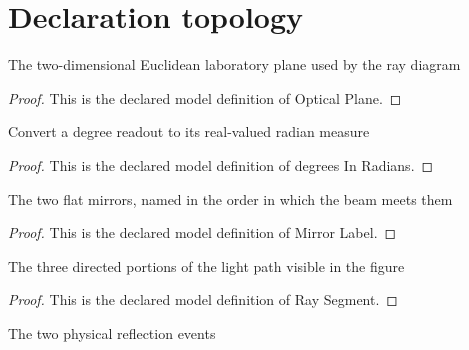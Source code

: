 \section{Declaration topology}
\begin{definition}
  \label{def:physics:phyx-mini-0142:phyxminiproblems-problemphyxmini0142-opticalplane}
  The two-dimensional Euclidean laboratory plane used by the ray diagram
\end{definition}
\begin{proof}
  This is the declared model definition of Optical Plane.
\end{proof}
\begin{definition}
  \label{def:physics:phyx-mini-0142:phyxminiproblems-problemphyxmini0142-degreesinradians}
  Convert a degree readout to its real-valued radian measure
\end{definition}
\begin{proof}
  This is the declared model definition of degrees In Radians.
\end{proof}
\begin{definition}
  \label{def:physics:phyx-mini-0142:phyxminiproblems-problemphyxmini0142-mirrorlabel}
  The two flat mirrors, named in the order in which the beam meets them
\end{definition}
\begin{proof}
  This is the declared model definition of Mirror Label.
\end{proof}
\begin{definition}
  \label{def:physics:phyx-mini-0142:phyxminiproblems-problemphyxmini0142-raysegment}
  The three directed portions of the light path visible in the figure
\end{definition}
\begin{proof}
  This is the declared model definition of Ray Segment.
\end{proof}
\begin{definition}
  \label{def:physics:phyx-mini-0142:phyxminiproblems-problemphyxmini0142-reflectionsite}
  The two physical reflection events
\end{definition}
